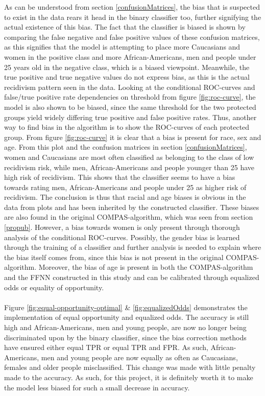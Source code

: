 \documentclass[11pt, fleqn, titlepage]{article}
\begin{document}
	As can be understood from section \ref{confusionMatrices}, the bias that is suspected to exist in the data rears it head in the binary classifier too, further signifying the actual existence of this bias. The fact that the classifier is biased is shown by comparing the false negative and false positive values of these confusion matrices, as this signifies that the model is attempting to place more Caucasians and women in the positive class and more African-Americans, men and people under 25 years old in the negative class, which is a biased viewpoint. Meanwhile, the true positive and true negative values do not express bias, as this is the actual recidivism pattern seen in the data. Looking at the conditional ROC-curves and false/true positive rate dependencies on threshold from figure \ref{fig:roc-curve}, the model is also shown to be biased, since the same threshold for the two protected groups yield widely differing true positive and false positive rates. Thus, another way to find bias in the algorithm is to show the ROC-curves of each protected group. From figure \ref{fig:roc-curve} it is clear that a bias is present for race, sex and age. From this plot and the confusion matrices in section \ref{confusionMatrices}, women and Caucasians are most often classified as belonging to the class of low recidivism risk, while men, African-Americans and people younger than 25 have high risk of recidivism. This shows that the classifier seems to have a bias towards rating men, African-Americans and people under 25 as higher risk of recidivism. The conclusion is thus that racial and age biases is obvious in the data from plots and has been inherited by the constructed classifier. These biases are also found in the original COMPAS-algorithm, which was seen from section \ref{propub}. However, a bias towards women is only present through thorough analysis of the conditional ROC-curves. Possibly, the gender bias is learned through the training of a classifier and further analysis is needed to explain where the bias itself comes from, since this bias is not present in the original COMPAS-algorithm.  Moreover, the bias of age is present in both the COMPAS-algorithm and the FFNN constructed in this study and can be calibrated through equalized odds or equality of opportunity.
	\\\\
	Figure \ref{fig:equal-opportunity-optimal} \& \ref{fig:equalizedOdds} demonstrates the implementation of equal opportunity and equalized odds. The accuracy is still high and African-Americans, men and young people, are now no longer being discriminated upon by the binary classifier, since the bias correction methods have ensured either equal TPR or equal TPR and FPR. As such, African-Americans, men and young people are now equally as often as Caucasians, females and older people misclassified. This change was made with little penalty made to the accuracy. As such, for this project, it is definitely worth it to make the model less biased for such a small decrease in accuracy. 
\end{document}
